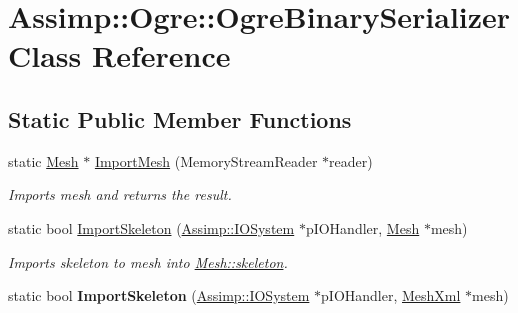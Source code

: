 \hypertarget{class_assimp_1_1_ogre_1_1_ogre_binary_serializer}{\section{Assimp\+:\+:Ogre\+:\+:Ogre\+Binary\+Serializer Class Reference}
\label{class_assimp_1_1_ogre_1_1_ogre_binary_serializer}
}
\subsection*{Static Public Member Functions}
\begin{DoxyCompactItemize}
\item 
static \hyperlink{class_assimp_1_1_ogre_1_1_mesh}{Mesh} $\ast$ \hyperlink{class_assimp_1_1_ogre_1_1_ogre_binary_serializer_a3b907a23d6f3d316b4e40767ebda4b68}{Import\+Mesh} (Memory\+Stream\+Reader $\ast$reader)
\begin{DoxyCompactList}\small\item\em Imports mesh and returns the result. \end{DoxyCompactList}\item 
static bool \hyperlink{class_assimp_1_1_ogre_1_1_ogre_binary_serializer_adca42c4976752dc1b146003bd7cea9dd}{Import\+Skeleton} (\hyperlink{class_assimp_1_1_i_o_system}{Assimp\+::\+I\+O\+System} $\ast$p\+I\+O\+Handler, \hyperlink{class_assimp_1_1_ogre_1_1_mesh}{Mesh} $\ast$mesh)
\begin{DoxyCompactList}\small\item\em Imports skeleton to {\ttfamily mesh} into \hyperlink{class_assimp_1_1_ogre_1_1_mesh_a6014a537b7b71a46e24ba56c6c2d738b}{Mesh\+::skeleton}. \end{DoxyCompactList}\item 
\hypertarget{class_assimp_1_1_ogre_1_1_ogre_binary_serializer_a4dd193c55c032c4051bcf02c5f2fda0a}{static bool {\bfseries Import\+Skeleton} (\hyperlink{class_assimp_1_1_i_o_system}{Assimp\+::\+I\+O\+System} $\ast$p\+I\+O\+Handler, \hyperlink{class_assimp_1_1_ogre_1_1_mesh_xml}{Mesh\+Xml} $\ast$mesh)}\label{class_assimp_1_1_ogre_1_1_ogre_binary_serializer_a4dd193c55c032c4051bcf02c5f2fda0a}

\end{DoxyCompactItemize}


